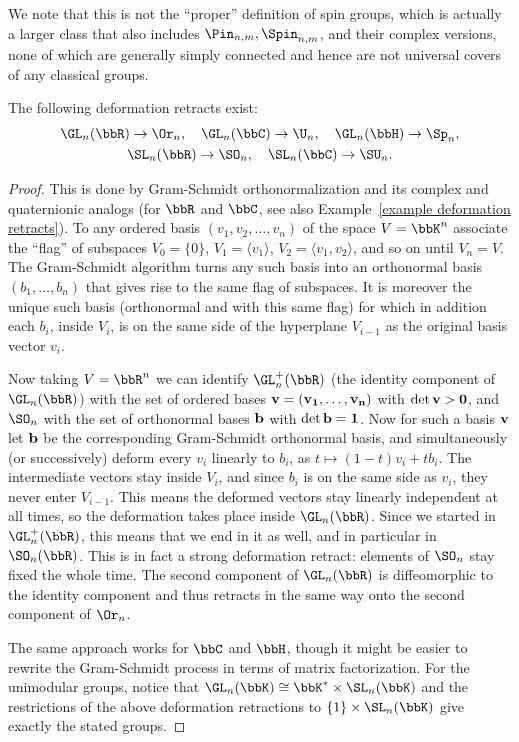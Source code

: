 We note that this is not the ``proper'' definition of spin groups, which is actually a larger class that also includes $\Pin_{n,m},\Spin_{n,m}$, and their complex versions, none of which are generally simply connected and hence are not universal covers of any classical groups.

\begin{prop}
    The following deformation retracts exist:
    \begin{gather}
        \GL_n(\bbR)\to \Or_n,\quad \GL_n(\bbC)\to \U_n, \quad \GL_n(\bbH)\to \Sp_n,\\
        \SL_n(\bbR)\to \SO_n,\quad \SL_n(\bbC)\to \SU_n.
    \end{gather}
\end{prop}
\begin{proof}
     This is done by Gram-Schmidt orthonormalization and its complex and quaternionic analogs (for $\bbR$ and $\bbC$, see also Example~\ref{example deformation retracts}). To any ordered basis $(v_1,v_2,\ldots,v_n)$ of the space $V=\bbK^n$ associate the ``flag'' of subspaces $V_0=\{0\}$, $V_1=\langle v_1\rangle$, $V_2=\langle v_1,v_2\rangle$, and so on until $V_n=V$. The Gram-Schmidt algorithm turns any such basis into an orthonormal basis $(b_1,\ldots,b_n)$ that gives rise to the same flag of subspaces. It is moreover the unique such basis (orthonormal and with this same flag) for which in addition each $b_i$, inside $V_i$, is on the same side of the hyperplane $V_{i-1}$ as the original basis vector $v_i$.

     Now taking $V=\bbR^n$ we can identify $\GL_n^+(\bbR)$ (the identity component of $\GL_n(\bbR)$) with the set of ordered bases $\bf{v}=(v_1,\ldots,v_n)$  with $\det \bf{v}>0$, and $\SO_n$ with the set of orthonormal bases $\bf{b}$ with $\det \bf{b}=1$. Now for such a basis $\bf{v}$ let $\bf{b}$ be the corresponding Gram-Schmidt orthonormal basis, and simultaneously (or successively) deform every $v_i$ linearly to $b_i$, as $t\mapsto (1-t)v_i+t b_i$. The intermediate vectors stay inside $V_i$, and since $b_i$ is on the same side as $v_i$, they never enter $V_{i-1}$. This means the deformed vectors stay linearly independent at all times, so the deformation takes place inside $\GL_n(\bbR)$. Since we started in $\GL^+_n(\bbR)$, this means that we end in it as well, and in particular in $\SO_n(\bbR)$. This is in fact a strong deformation retract: elements of $\SO_n$ stay fixed the whole time. The second component of $\GL_n(\bbR)$ is diffeomorphic to the identity component and thus retracts in the same way onto the second component of $\Or_n$.

     The same approach works for $\bbC$ and $\bbH$, though it might be easier to rewrite the Gram-Schmidt process in terms of matrix factorization. For the unimodular groups, notice that $\GL_n(\bbK)\cong \bbK^\ast \times \SL_n(\bbK)$ and the restrictions of the above deformation retractions to $\{1\}\times \SL_n(\bbK)$ give exactly the stated groups.
\end{proof}


